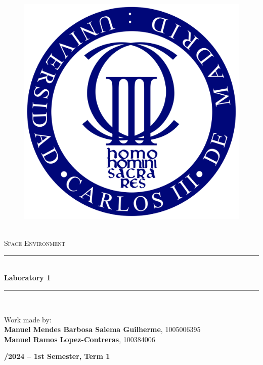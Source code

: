 \documentclass[12pt]{article}
\newcommand{\HRule}{\rule{\linewidth}{0.5mm}} %
\begin{document}
\begin{center}
    \begin{figure}
        \vspace{-1.0cm}
        \includegraphics[scale = 0.1, center]{Images/Logo_UC3M.svg.png} %
    \end{figure}
    \mbox{}\\[2.0cm]
    \textsc{\Huge Space Environment}\\[2.5cm]
    \HRule\\[0.4cm]
    {\large \bf {\selectfont Laboratory 1} \\[0.2cm]}
    \HRule
    \\[1.5cm]
\end{center}


\begin{center}

    \begin{flushleft}
        Work made by:\\[0.3cm] 
        \textbf{Manuel Mendes Barbosa Salema Guilherme}, 1005006395\\ 
        \textbf{Manuel Ramos Lopez-Contreras}, 100384006\\[6.0cm]
    \end{flushleft}
\end{center}
\begin{flushleft}
\end{flushleft}
\begin{center}
    \large \bf {}/2024 -- 1st Semester, Term 1
\end{center}
\end{document}
